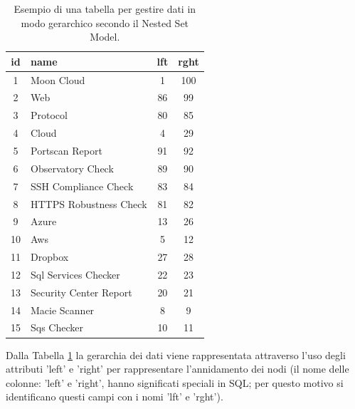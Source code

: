 \begin{table}[ht!]
\centering
\begin{tabular}[c]{| c | l | c | c |} 
    \hline
    id & name & lft & rght \\ [0.5ex] 
    \hline
    \rowcolor{rootnodecell} 1 & Moon Cloud & 1 & 100 \\ [0.5ex] 
    \rowcolor{categorycell} 2 & Web & 86 & 99 \\ [0.5ex] 
    \rowcolor{categorycell} 3 & Protocol & 80 & 85 \\ [0.5ex] 
    \rowcolor{categorycell} 4 & Cloud & 4 & 29 \\ [0.5ex] 
    \rowcolor{evaluationcell} 5 & Portscan Report & 91 & 92 \\ [0.5ex] 
    \rowcolor{evaluationcell} 6 & Observatory Check & 89 & 90 \\ [0.5ex] 
    \rowcolor{evaluationcell} 7 & SSH Compliance Check & 83 & 84 \\ [0.5ex] 
    \rowcolor{evaluationcell} 8 & HTTPS Robustness Check & 81 & 82 \\ [0.5ex] 
    \rowcolor{categorycell} 9 & Azure & 13 & 26 \\ [0.5ex] 
    \rowcolor{categorycell} 10 & Aws & 5 & 12 \\ [0.5ex] 
    \rowcolor{categorycell} 11 & Dropbox & 27 & 28 \\ [0.5ex] 
    \rowcolor{evaluationcell} 12 & Sql Services Checker & 22 & 23 \\ [0.5ex] 
    \rowcolor{evaluationcell} 13 & Security Center Report & 20 & 21 \\ [0.5ex] 
    \rowcolor{evaluationcell} 14 & Macie Scanner & 8 & 9 \\ [0.5ex] 
    \rowcolor{evaluationcell} 15 & Sqs Checker & 10 & 11 \\ [0.5ex]
    \hline
\end{tabular}
\caption{Esempio di una tabella per gestire dati in modo gerarchico secondo il Nested Set Model.}
\label{table:nested_set_model_table}
\end{table}
\hfill\break
Dalla Tabella \ref{table:nested_set_model_table} la gerarchia dei dati viene rappresentata attraverso l'uso 
degli attributi 'left' e 'right' per rappresentare l'annidamento dei nodi (il nome delle colonne: 'left' e 'right', hanno significati 
speciali in SQL; per questo motivo si identificano questi campi con i nomi 'lft' e 'rght').
%

